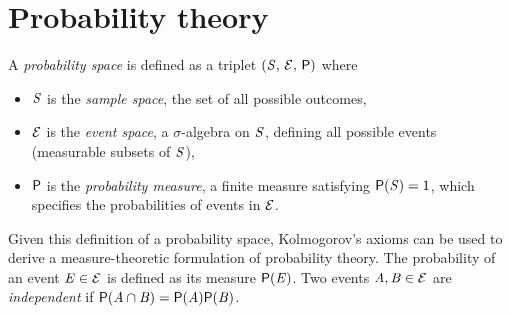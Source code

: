
\section{Probability theory}\label{sec:probability-theory}

A \emph{probability space} is defined as a triplet $(\mathit{S},\,\mathcal{E},\,\mathsf{P})$ where

\begin{itemize}
  \item $\mathit{S}$ is the \emph{sample space}, the set of all possible outcomes,
  \item $\mathcal{E}$ is the \emph{event space}, a $\sigma$-algebra on $\mathit{S}$, defining all possible events (measurable subsets of $\mathit{S}$),
  \item $\mathsf{P}$ is the \emph{probability measure}, a finite measure satisfying $\mathsf{P}(\mathit{S}) = 1$, which specifies the probabilities of events in $\mathcal{E}$.
\end{itemize}

Given this definition of a probability space, Kolmogorov's axioms \citep{kolmogorov1950foundations} can be used to derive a measure-theoretic formulation of probability theory. The probability of an event $\mathit{E} \in \mathcal{E}$ is defined as its measure $\mathsf{P}(\mathit{E})$. Two events $\mathit{A},\mathit{B} \in \mathcal{E}$ are \emph{independent} if $\mathsf{P}(\mathit{A}\cap\mathit{B}) = \mathsf{P}(\mathit{A})\mathsf{P}(\mathit{B})$.

